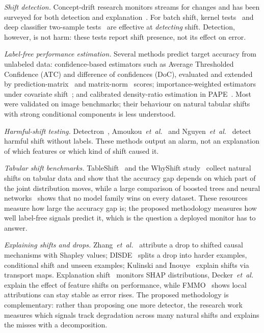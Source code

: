 \documentclass[conference]{IEEEtran}
\makeatletter
\def\section{\@startsection{section}{1}{\z@}{1.5ex plus 1.5ex minus 0.5ex}{0.7ex plus 1ex minus 0ex}{\normalfont\normalsize\centering\itshape}}
\theoremstyle{plainhead}
\makeatother
\begin{document}
\section{Related Work}
\textit{Shift detection.} Concept-drift research monitors streams for changes and has been surveyed for both detection and explanation~\cite{hinder2024a,hinder2024b}. For batch shift, kernel tests~\cite{biggs2023mmdfuse} and deep classifier two-sample tests~\cite{pandeva2024e} are effective at \emph{detecting} shift. Detection, however, is not harm: these tests report shift presence, not its effect on error.

\textit{Label-free performance estimation.} Several methods predict target accuracy from unlabeled data: confidence-based estimators such as Average Thresholded Confidence (ATC) and difference of confidences (DoC), evaluated and extended by prediction-matrix~\cite{deng2023confidence} and matrix-norm~\cite{xie2024mano} scores; importance-weighted estimators under covariate shift~\cite{kato2023double}; and calibrated density-ratio estimation in PAPE~\cite{bialek2025pape}. Most were validated on image benchmarks; their behaviour on natural tabular shifts with strong conditional components is less understood.

\textit{Harmful-shift testing.} Detectron~\cite{ginsberg2023detectron}, Amoukou~\textit{et~al.}~\cite{amoukou2024sequential} and Nguyen~\textit{et~al.}~\cite{nguyen2025reliably} detect harmful shift without labels. These methods output an alarm, not an explanation of which features or which kind of shift caused it.

\textit{Tabular shift benchmarks.} TableShift~\cite{gardner2023tableshift} and the WhyShift study~\cite{liu2023need} collect natural shifts on tabular data and show that the accuracy gap depends on which part of the joint distribution moves, while a large comparison of boosted trees and neural networks~\cite{mcelfresh2023neural} shows that no model family wins on every dataset. These resources measure how large the accuracy gap is; the proposed methodology measures how well label-free signals predict it, which is the question a deployed monitor has to answer.

\textit{Explaining shifts and drops.} Zhang~\textit{et~al.}~\cite{zhang2023why} attribute a drop to shifted causal mechanisms with Shapley values; DISDE~\cite{cai2023diagnosing} splits a drop into harder examples, conditional shift and unseen examples; Kulinski and Inouye~\cite{kulinski2023explaining} explain shifts via transport maps. Explanation shift~\cite{mougan2023explanation} monitors SHAP distributions, Decker~\textit{et~al.}~\cite{decker2024explanatory} explain the effect of feature shifts on performance, while FMMO~\cite{zafar2026fmmo} shows local attributions can stay stable as error rises. The proposed methodology is complementary: rather than proposing one more detector, the research work measures which signals track degradation across many natural shifts and explains the misses with a decomposition.
\end{document}
